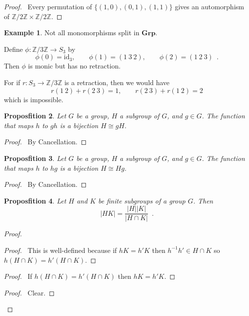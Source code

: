 \documentclass{book}
\let\qed\relax
\newtheorem{prop}{Proposfition}[chapter]
\theoremstyle{definition}
\newtheorem{ex}[prop]{Example}
\newcommand{\Grp}{\ensuremath{\mathbf{Grp}}}
\newcommand{\id}[1]{\ensuremath{\mathrm{id}_{#1}}}
\newcommand{\inv}[1]{\ensuremath{{#1}^{-1}}}
\begin{document}
\begin{proof}
    \pf\ Every permutation of $\{ (1,0), (0,1), (1,1) \}$ gives an automorphism of $\mathbb{Z} / 2 \mathbb{Z} \times \mathbb{Z} / 2 \mathbb{Z}$. \qed
\end{proof}

\begin{ex}
Not all monomorphisms split in $\Grp$.

Define $\phi : \mathbb{Z} / 3 \mathbb{Z} \rightarrow S_3$ by
\[ \phi(0) = \id{3}, \qquad \phi(1) = (1 \ 3 \ 2), \qquad \phi(2) = (1 \ 2 \ 3) \enspace . \]
Then $\phi$ is monic but has no retraction.

For if $r : S_3 \rightarrow \mathbb{Z} / 3 \mathbb{Z}$ is a retraction, then we would have
\[ r(1\ 2) + r(2\ 3) = 1, \qquad r(2\ 3) + r(1\ 2) = 2 \]
which is impossible.
\end{ex}

\begin{prop}
Let $G$ be a group, $H$ a subgroup of $G$, and $g \in G$. The function that maps $h$ to $gh$ is a bijection $H \cong gH$.
\end{prop}

\begin{proof}
\pf\ By Cancellation. \qed
\end{proof}

\begin{prop}
Let $G$ be a group, $H$ a subgroup of $G$, and $g \in G$. The function that maps $h$ to $hg$ is a bijection $H \cong Hg$.
\end{prop}

\begin{proof}
\pf\ By Cancellation. \qed
\end{proof}

\begin{prop}
\label{prop:order-of-HK}
Let $H$ and $K$ be finite subgroups of a group $G$. Then
\[ |HK| = \frac{|H||K|}{|H \cap K|} \enspace . \]
\end{prop}

\begin{proof}
\pf
{}
\begin{proof}
	\pf\ This is well-defined because if $hK = h'K$ then $\inv{h} h' \in H \cap K$ so $h(H \cap K) = h'(H \cap K)$.
\end{proof}
\begin{proof}
	\pf\ If $h(H \cap K) = h'(H \cap K)$ then $hK = h'K$.
\end{proof}
\begin{proof}
	\pf\ Clear.
\end{proof}
\qed
\end{proof}
\end{document}

